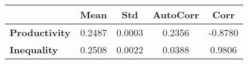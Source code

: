 \begin{tiny}\begin{tabular}{|l|c|c|c|c|}
\hline
&\textbf{Mean}&\textbf{Std}&\textbf{AutoCorr}&\textbf{Corr}\\\hline
\textbf{Productivity}&0.2487&0.0003&0.2356&-0.8780\\\hline
\textbf{Inequality}&0.2508&0.0022&0.0388&0.9806\\\hline
\end{tabular}
\end{tiny}